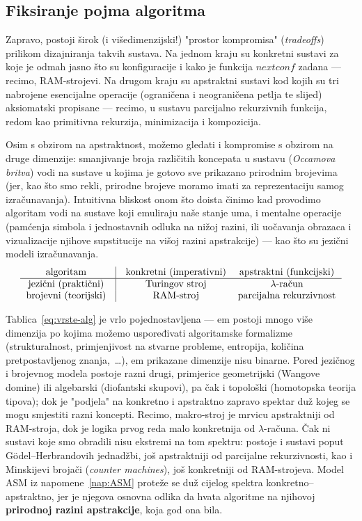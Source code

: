 \subsection{Fiksiranje pojma algoritma}

Zapravo, postoji širok (i višedimenzijski!) "prostor kompromisa" (\emph{tradeoffs}) prilikom dizajniranja takvih sustava. Na jednom kraju su konkretni sustavi za koje je odmah jasno što su konfiguracije i kako je funkcija $nextconf$ zadana --- recimo, RAM-strojevi. Na drugom kraju su apstraktni sustavi kod kojih su tri nabrojene esencijalne operacije (ograničena i neograničena petlja te slijed) aksiomatski propisane --- recimo, u sustavu parcijalno rekurzivnih funkcija, redom kao primitivna rekurzija, minimizacija i kompozicija.

Osim s obzirom na apstraktnost, možemo gledati i kompromise s obzirom na druge dimenzije: smanjivanje broja različitih koncepata u sustavu (\emph{Occamova britva}) vodi na sustave u kojima je gotovo sve prikazano prirodnim brojevima (jer, kao što smo rekli, prirodne brojeve moramo imati za reprezentaciju samog izračunavanja). Intuitivna bliskost onom što doista činimo kad provodimo algoritam vodi na sustave koji emuliraju naše stanje uma, i mentalne operacije (pamćenja simbola i jednostavnih odluka na nižoj razini, ili uočavanja obrazaca i vizualizacije njihove supstitucije na višoj razini apstrakcije) --- kao što su jezični modeli izračunavanja.
\begin{equation}\label{eq:vrste-alg}
    \begin{tabular}{c@{\quad}|@{\quad}cc}
        algoritam & konkretni (imperativni) & apstraktni (funkcijski)\\\hline
     jezični (praktični) & Turingov stroj & $\lambda$-račun\\
     brojevni (teorijski) & RAM-stroj & parcijalna rekurzivnost
    \end{tabular}
\end{equation}

Tablica~\eqref{eq:vrste-alg} je vrlo pojednostavljena --- em postoji mnogo više dimenzija po kojima možemo uspoređivati algoritamske formalizme (strukturalnost, primjenjivost na stvarne probleme, entropija, količina pretpostavljenog znanja,~\ldots), em prikazane dimenzije nisu binarne. Pored jezičnog i brojevnog modela postoje razni drugi, primjerice geometrijski (Wangove domine) ili algebarski (diofantski skupovi), pa čak i topološki (homotopska teorija tipova); dok je "podjela" na konkretno i apstraktno zapravo spektar duž kojeg se mogu smjestiti razni koncepti. Recimo, makro-stroj je mrvicu apstraktniji od RAM-stroja, dok je logika prvog reda malo konkretnija od $\lambda$-računa. Čak ni sustavi koje smo obradili nisu ekstremi na tom spektru: postoje i sustavi poput G\"odel--Herbrandovih jednadžbi, još apstraktniji od parcijalne rekurzivnosti, kao i Minskijevi brojači (\emph{counter machines}), još konkretniji od RAM-strojeva. Model ASM iz napomene~\ref{nap:ASM} proteže se duž cijelog spektra konkretno--apstraktno, jer je njegova osnovna odlika da hvata algoritme na njihovoj \textbf{prirodnoj razini apstrakcije}, koja god ona bila.


